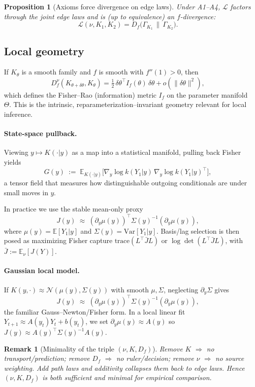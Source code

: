 \documentclass[11pt]{article}
\newtheorem{proposition}{Proposition}
\newtheorem{remark}{Remark}
\newcommand{\E}{\mathbb{E}}
\newcommand{\1}{\mathbf{1}}
\begin{document}
\begin{proposition}[Axioms force divergence on edge laws]\label{prop:representation}
Under A1--A4, $\mathcal L$ factors through the joint edge laws and is (up to equivalence) 
an $f$-divergence:
\[
\mathcal L(\nu,K_1,K_2)=D_f\!\big(\Gamma_{K_1}\,\big\|\,\Gamma_{K_2}\big).
\]
\end{proposition}

\subsection{Local geometry}
If $K_\theta$ is a smooth family and $f$ is smooth with $f''(1)>0$, then
\[
D_f^\nu(K_{\theta+\delta\theta},K_\theta)
= \tfrac12\,\delta\theta^\top I_f(\theta)\,\delta\theta
+ o(\|\delta\theta\|^2),
\]
which defines the Fisher--Rao (information) metric $I_f$ on the parameter manifold~$\Theta$. 
This is the intrinsic, reparameterization--invariant geometry relevant for local inference.

\paragraph{State-space pullback.}
Viewing $y\mapsto K(\cdot|y)$ as a map into a statistical manifold, pulling back Fisher yields
\[
G(y) \;:=\; \E_{K(\cdot|y)}\!\big[\nabla_y \log k(Y_1|y)\,\nabla_y \log k(Y_1|y)^\top\big],
\]
a tensor field that measures how distinguishable outgoing conditionals are under small moves in $y$.

In practice we use the stable mean-only proxy 
\[
J(y)\;\approx\;(\partial_y\mu(y))^\top \Sigma(y)^{-1} (\partial_y\mu(y)),
\]
where $\mu(y)=\E[Y_1|y]$ and $\Sigma(y)=\mathrm{Var}[Y_1|y]$. Basis/lag selection is then posed 
as maximizing Fisher capture $\mathrm{trace}(L^\top \bar J L)$ or $\log\det(L^\top \bar J L)$, 
with $\bar J := \E_\nu[J(Y)]$.

\paragraph{Gaussian local model.}
If $K(y,\cdot)\approx \mathcal N(\mu(y),\Sigma(y))$ with smooth $\mu,\Sigma$, neglecting $\partial_y\Sigma$ gives
\[
J(y)\;\approx\;(\partial_y\mu(y))^\top \Sigma(y)^{-1} (\partial_y\mu(y)),
\]
the familiar Gauss--Newton/Fisher form. In a local linear fit $Y_{t+1}\approx A(y_t)Y_t+b(y_t)$,
we set $\partial_y\mu(y)\!\approx\!A(y)$ so $J(y)\!\approx\!A(y)^\top \Sigma(y)^{-1} A(y)$.

\begin{remark}[Minimality of the triple $(\nu,K,D_f)$]
Remove $K$ $\Rightarrow$ no transport/prediction; remove $D_f$ $\Rightarrow$ no ruler/decision; 
remove $\nu$ $\Rightarrow$ no source weighting. Add path laws and additivity collapses them back 
to edge laws. Hence $(\nu,K,D_f)$ is both sufficient and minimal for empirical comparison.
\end{remark}
\end{document}
